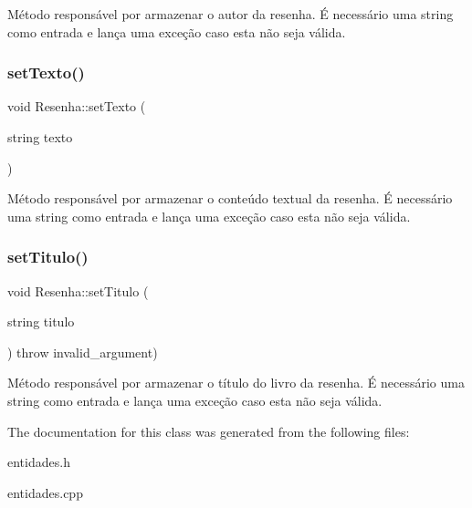 Método responsável por armazenar o autor da resenha. É necessário uma string como entrada e lança uma exceção caso esta não seja válida. \mbox{\label{classResenha_a6fd61b3ffeee4365aa8aaab69b16d41a}} 
\subsubsection{\texorpdfstring{set\+Texto()}{setTexto()}}
{\footnotesize\ttfamily void Resenha\+::set\+Texto (\begin{DoxyParamCaption}\item[{string}]{texto }\end{DoxyParamCaption})}

Método responsável por armazenar o conteúdo textual da resenha. É necessário uma string como entrada e lança uma exceção caso esta não seja válida. \mbox{\label{classResenha_a4f2bf94388381e3ce05fe5d63ac23e4f}} 
\subsubsection{\texorpdfstring{set\+Titulo()}{setTitulo()}}
{\footnotesize\ttfamily void Resenha\+::set\+Titulo (\begin{DoxyParamCaption}\item[{string}]{titulo }\end{DoxyParamCaption}) throw  invalid\+\_\+argument) }

Método responsável por armazenar o título do livro da resenha. É necessário uma string como entrada e lança uma exceção caso esta não seja válida. 

The documentation for this class was generated from the following files\+:\begin{DoxyCompactItemize}
\item 
entidades.\+h\item 
entidades.\+cpp\end{DoxyCompactItemize}
